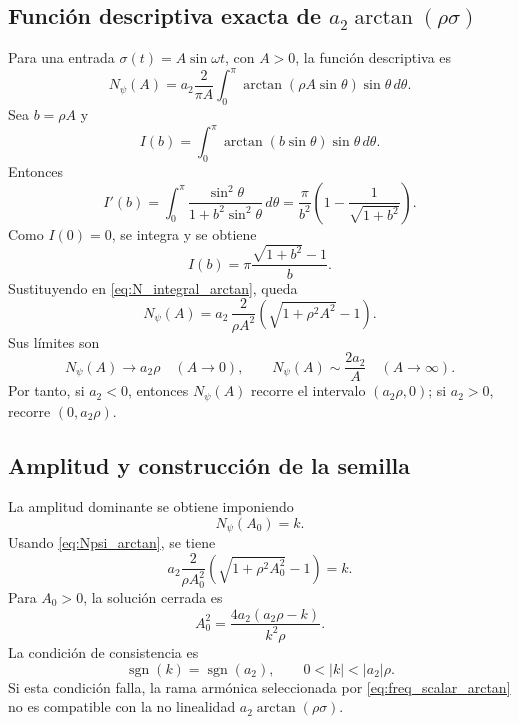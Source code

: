 \documentclass[journal]{IEEEtran}
\DeclareMathOperator{\sgn}{sgn}
\begin{document}
\subsection{Función descriptiva exacta de \texorpdfstring{$a_2\arctan(\rho\sigma)$}{a2 arctan(rho sigma)}}

Para una entrada $\sigma(t)=A\sin\omega t$, con $A>0$, la función descriptiva es
\begin{equation}
\label{eq:N_integral_arctan}
N_\psi(A)=a_2\frac{2}{\pi A}\int_0^\pi \arctan(\rho A\sin\theta)\sin\theta\,d\theta.
\end{equation}
Sea $b=\rho A$ y
\begin{equation}
\label{eq:I_arctan}
I(b)=\int_0^\pi \arctan(b\sin\theta)\sin\theta\,d\theta.
\end{equation}
Entonces
\begin{equation}
\label{eq:Iprime_arctan}
I'(b)=\int_0^\pi \frac{\sin^2\theta}{1+b^2\sin^2\theta}\,d\theta
=\frac{\pi}{b^2}\left(1-\frac{1}{\sqrt{1+b^2}}\right).
\end{equation}
Como $I(0)=0$, se integra y se obtiene
\begin{equation}
\label{eq:Iclosed_arctan}
I(b)=\pi\frac{\sqrt{1+b^2}-1}{b}.
\end{equation}
Sustituyendo en \eqref{eq:N_integral_arctan}, queda
\begin{equation}
\label{eq:Npsi_arctan}
N_\psi(A)=a_2\,\frac{2}{\rho A^2}\left(\sqrt{1+\rho^2A^2}-1\right).
\end{equation}
Sus límites son
\begin{equation}
\label{eq:Npsi_limits_arctan}
N_\psi(A)\to a_2\rho\quad (A\to0),
\qquad
N_\psi(A)\sim \frac{2a_2}{A}\quad (A\to\infty).
\end{equation}
Por tanto, si $a_2<0$, entonces $N_\psi(A)$ recorre el intervalo $(a_2\rho,0)$; si $a_2>0$, recorre $(0,a_2\rho)$.

\subsection{Amplitud y construcción de la semilla}

La amplitud dominante se obtiene imponiendo
\begin{equation}
\label{eq:amp_eq_arctan}
N_\psi(A_0)=k.
\end{equation}
Usando \eqref{eq:Npsi_arctan}, se tiene
\begin{equation}
\label{eq:amp_eq_arctan_expanded}
a_2\frac{2}{\rho A_0^2}\left(\sqrt{1+\rho^2A_0^2}-1\right)=k.
\end{equation}
Para $A_0>0$, la solución cerrada es
\begin{equation}
\label{eq:A0_arctan_general}
A_0^2=\frac{4a_2(a_2\rho-k)}{k^2\rho}.
\end{equation}
La condición de consistencia es
\begin{equation}
\label{eq:consistencia_arctan}
\sgn(k)=\sgn(a_2),
\qquad
0<|k|<|a_2|\rho.
\end{equation}
Si esta condición falla, la rama armónica seleccionada por \eqref{eq:freq_scalar_arctan} no es compatible con la no linealidad $a_2\arctan(\rho\sigma)$.
\end{document}
